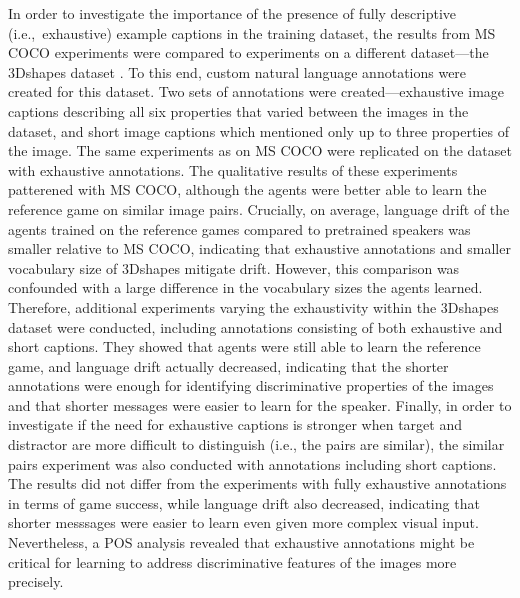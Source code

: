 In order to investigate the importance of the presence of fully descriptive (i.e.,~exhaustive) example captions in the training dataset, the results from MS COCO experiments were compared to experiments on a different dataset---the 3Dshapes dataset \parencite{burgess20183d}. To this end, custom natural language annotations were created for this dataset. Two sets of annotations were created---exhaustive image captions describing all six properties that varied between the images in the dataset, and short image captions which mentioned only up to three properties of the image.
The same experiments as on MS COCO were replicated on the dataset with exhaustive annotations. The qualitative results of these experiments patterened with MS COCO, although the agents were better able to learn the reference game on similar image pairs. Crucially, on average, language drift of the agents trained on the reference games compared to pretrained speakers was smaller relative to MS COCO, indicating that exhaustive annotations and smaller vocabulary size of 3Dshapes mitigate drift. However, this comparison was confounded with a large difference in the vocabulary sizes the agents learned. 
Therefore, additional experiments varying the exhaustivity within the 3Dshapes dataset were conducted, including annotations consisting of both exhaustive and short captions. They showed that agents were still able to learn the reference game, and language drift actually decreased, indicating that the shorter annotations were enough for identifying discriminative properties of the images and that shorter messages were easier to learn for the speaker. Finally, in order to investigate if the need for exhaustive captions is stronger when target and distractor are more difficult to distinguish (i.e., the pairs are similar), the similar pairs experiment was also conducted with annotations including short captions. The results did not differ from the experiments with fully exhaustive annotations in terms of game success, while language drift also decreased, indicating that shorter messsages were easier to learn even given more complex visual input. Nevertheless, a POS analysis revealed that exhaustive annotations might be critical for learning to address discriminative features of the images more precisely.

